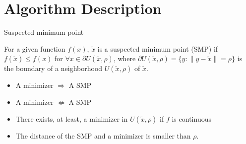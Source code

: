 \documentclass{beamer}
\begin{document}
\section{Algorithm Description}
\begin{frame}{Suspected minimum point}
	
\begin{definition}
	For a given function $f(x)$,
	$\tilde{x}$ is a suspected minimum point (SMP) if $f(\tilde
	x)\leq f(x)$ for $\forall x\in \partial U(\tilde{x},\rho)$,
	where $\partial U(\tilde{x},\rho) = \{y: \|y-\tilde{x}\|=\rho \}$ is the boundary of
	a neighborhood $U(\tilde{x}, \rho)$ of $\tilde{x}$.
\end{definition}

\begin{itemize}
	\item A minimizer $\Rightarrow$ A SMP
	\item A minimizer $\nLeftarrow$ A SMP
	\item There exists, at least, a minimizer in $U(\tilde x,
		\rho)$ if $f$ is continuous
	\item The distance of the SMP and a minimizer is smaller than $\rho$.
\end{itemize}
\end{frame}
\end{document}
